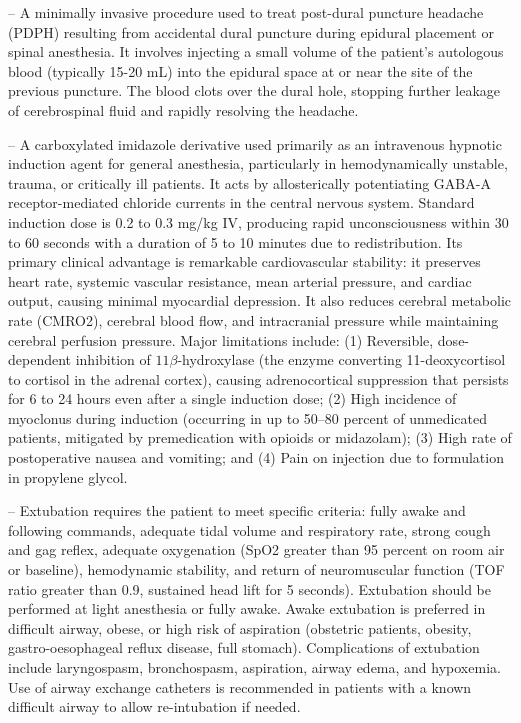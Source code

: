 -- A minimally invasive procedure used to treat post-dural puncture headache (PDPH) resulting from accidental dural puncture during epidural placement or spinal anesthesia. It involves injecting a small volume of the patient's autologous blood (typically 15-20 mL) into the epidural space at or near the site of the previous puncture. The blood clots over the dural hole, stopping further leakage of cerebrospinal fluid and rapidly resolving the headache.

-- A carboxylated imidazole derivative used primarily as an intravenous hypnotic induction agent for general anesthesia, particularly in hemodynamically unstable, trauma, or critically ill patients. It acts by allosterically potentiating GABA-A receptor-mediated chloride currents in the central nervous system. Standard induction dose is 0.2 to 0.3 mg/kg IV, producing rapid unconsciousness within 30 to 60 seconds with a duration of 5 to 10 minutes due to redistribution. Its primary clinical advantage is remarkable cardiovascular stability: it preserves heart rate, systemic vascular resistance, mean arterial pressure, and cardiac output, causing minimal myocardial depression. It also reduces cerebral metabolic rate (CMRO2), cerebral blood flow, and intracranial pressure while maintaining cerebral perfusion pressure. Major limitations include: (1) Reversible, dose-dependent inhibition of $11\beta$-hydroxylase (the enzyme converting 11-deoxycortisol to cortisol in the adrenal cortex), causing adrenocortical suppression that persists for 6 to 24 hours even after a single induction dose; (2) High incidence of myoclonus during induction (occurring in up to 50--80 percent of unmedicated patients, mitigated by premedication with opioids or midazolam); (3) High rate of postoperative nausea and vomiting; and (4) Pain on injection due to formulation in propylene glycol.

-- Extubation requires the patient to meet specific criteria: fully awake and following commands, adequate tidal volume and respiratory rate, strong cough and gag reflex, adequate oxygenation (SpO2 greater than 95 percent on room air or baseline), hemodynamic stability, and return of neuromuscular function (TOF ratio greater than 0.9, sustained head lift for 5 seconds). Extubation should be performed at light anesthesia or fully awake. Awake extubation is preferred in difficult airway, obese, or high risk of aspiration (obstetric patients, obesity, gastro-oesophageal reflux disease, full stomach). Complications of extubation include laryngospasm, bronchospasm, aspiration, airway edema, and hypoxemia. Use of airway exchange catheters is recommended in patients with a known difficult airway to allow re-intubation if needed.

